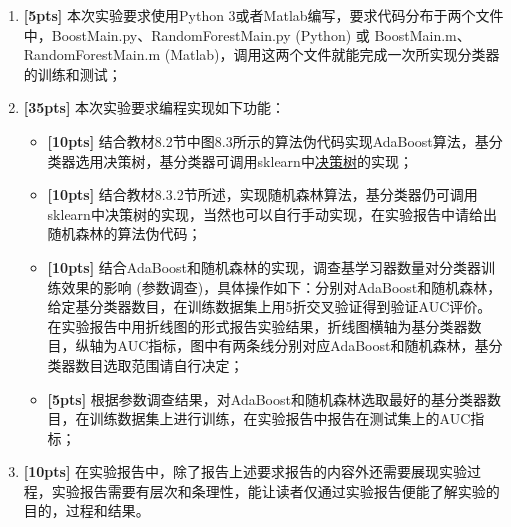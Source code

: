 \documentclass[a4paper,UTF8]{article}
\numberwithin{equation}{section}
\begin{document}
\begin{enumerate}[(1)]
	\item \textbf{[5pts]} 本次实验要求使用Python 3或者Matlab编写，要求代码分布于两个文件中，BoostMain.py、RandomForestMain.py (Python) 或 BoostMain.m、RandomForestMain.m (Matlab)，调用这两个文件就能完成一次所实现分类器的训练和测试；
	
	\item \textbf{[35pts]} 本次实验要求编程实现如下功能：
	
	\begin{itemize}
		\item \textbf{[10pts]} 结合教材8.2节中图8.3所示的算法伪代码实现AdaBoost算法，基分类器选用决策树，基分类器可调用sklearn中\href{http://scikit-learn.org/stable/modules/generated/sklearn.tree.DecisionTreeClassifier.html}{决策树}的实现；
		\item \textbf{[10pts]} 结合教材8.3.2节所述，实现随机森林算法，基分类器仍可调用sklearn中决策树的实现，当然也可以自行手动实现，在实验报告中请给出随机森林的算法伪代码；
		\item \textbf{[10pts]} 结合AdaBoost和随机森林的实现，调查基学习器数量对分类器训练效果的影响 (参数调查)，具体操作如下：分别对AdaBoost和随机森林，给定基分类器数目，在训练数据集上用5折交叉验证得到验证AUC评价。在实验报告中用折线图的形式报告实验结果，折线图横轴为基分类器数目，纵轴为AUC指标，图中有两条线分别对应AdaBoost和随机森林，基分类器数目选取范围请自行决定；
		\item \textbf{[5pts]} 根据参数调查结果，对AdaBoost和随机森林选取最好的基分类器数目，在训练数据集上进行训练，在实验报告中报告在测试集上的AUC指标；
	\end{itemize}
	
	\item \textbf{[10pts]} 在实验报告中，除了报告上述要求报告的内容外还需要展现实验过程，实验报告需要有层次和条理性，能让读者仅通过实验报告便能了解实验的目的，过程和结果。
	
\end{enumerate}
\end{document}
